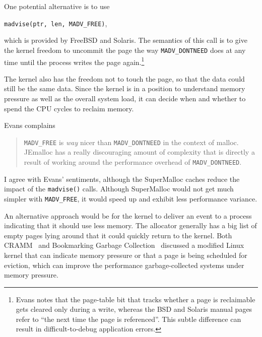\documentclass[natbib,sort&compress]{sigplanconf}
\newcommand{\code}[1]{\texttt{#1}}
\begin{document}
One potential alternative is to use
\begin{center}
\code{madvise(ptr, len, MADV_FREE)},
\end{center}
which is provided by FreeBSD and Solaris.  The semantics of this call
is to give the kernel freedom to uncommit the page the way
\code{MADV_DONTNEED} does at any time until the process writes the
page again.\footnote{Evans notes \cite{Evans15-personal-communication}
  that the page-table bit that tracks whether a page is reclaimable
  gets cleared only during a write, whereas the BSD and Solaris manual
  pages refer to ``the next time the page is referenced''.  This
  subtle difference can result in difficult-to-debug application
  errors.}

  The kernel also has the freedom not to touch the page, so
that the data could still be the same data.  Since the kernel is in a
position to understand memory pressure as well as the overall system
load, it can decide when and whether to spend the CPU cycles to
reclaim memory.


Evans complains \cite{Evans12}
\begin{quote}
 \code{MADV_FREE} is \textit{way} nicer than \code{MADV_DONTNEED} in
 the context of malloc.  JEmalloc has a really discouraging amount of
 complexity that is directly a result of working around the
 performance overhead of \code{MADV_DONTNEED}.
\end{quote}
I agree with Evans' sentiments, although the SuperMalloc caches reduce
the impact of the \code{madvise()} calls.  Although SuperMalloc would
not get much simpler with \code{MADV_FREE}, it would speed up and
exhibit less performance variance.

An alternative approach would be for the kernel to deliver an event to
a process indicating that it should use less memory.  The allocator
generally has a big list of empty pages lying around that it could
quickly return to the kernel.  Both CRAMM~\cite{YangBeKa06} and
Bookmarking Garbage Collection~\cite{HertzFeBe05} discussed a
modified Linux kernel that can indicate memory pressure or that a page
is being scheduled for eviction, which can improve the performance
garbage-collected systems under memory pressure.
\end{document}

